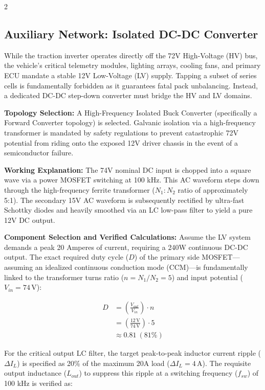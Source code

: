 \begin{multicols}{2}
\subsection{Auxiliary Network: Isolated DC-DC Converter}

While the traction inverter operates directly off the 72V High-Voltage (HV) bus, the vehicle's critical telemetry modules, lighting arrays, cooling fans, and primary ECU mandate a stable 12V Low-Voltage (LV) supply. Tapping a subset of series cells is fundamentally forbidden as it guarantees fatal pack unbalancing. Instead, a dedicated DC-DC step-down converter must bridge the HV and LV domains.

\textbf{Topology Selection:} A High-Frequency Isolated Buck Converter (specifically a Forward Converter topology) is selected. Galvanic isolation via a high-frequency transformer is mandated by safety regulations to prevent catastrophic 72V potential from riding onto the exposed 12V driver chassis in the event of a semiconductor failure. 

\textbf{Working Explanation:} The 74V nominal DC input is chopped into a square wave via a power MOSFET switching at 100 kHz. This AC waveform steps down through the high-frequency ferrite transformer ($N_1:N_2$ ratio of approximately 5:1). The secondary 15V AC waveform is subsequently rectified by ultra-fast Schottky diodes and heavily smoothed via an LC low-pass filter to yield a pure 12V DC output. 

\textbf{Component Selection and Verified Calculations:}
Assume the LV system demands a peak 20 Amperes of current, requiring a 240W continuous DC-DC output. The exact required duty cycle ($D$) of the primary side MOSFET—assuming an idealized continuous conduction mode (CCM)—is fundamentally linked to the transformer turns ratio ($n = N_1/N_2 = 5$) and input potential ($V_{in} = 74\,\mathrm{V}$):

\begin{equation} \label{eq:duty_cycle}
\begin{split}
D &= \left( \frac{V_{out}}{V_{in}} \right) \cdot n \\
&= \left( \frac{12\,\mathrm{V}}{74\,\mathrm{V}} \right) \cdot 5 \\
&\approx 0.81 \ (81\%)
\end{split}
\end{equation}

For the critical output LC filter, the target peak-to-peak inductor current ripple ($\Delta I_L$) is specified as 20\% of the maximum 20A load ($\Delta I_L = 4\,\mathrm{A}$). The requisite output inductance ($L_{out}$) to suppress this ripple at a switching frequency ($f_{sw}$) of 100 kHz is verified as:


\end{multicols}
